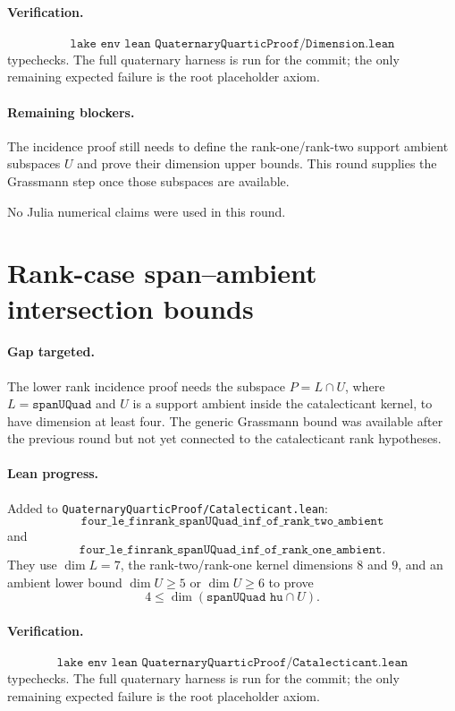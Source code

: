 \documentclass[11pt]{article}
\begin{document}
\paragraph{Verification.}
\[
\texttt{lake env lean QuaternaryQuarticProof/Dimension.lean}
\]
typechecks.  The full quaternary harness is run for the commit; the only
remaining expected failure is the root placeholder axiom.

\paragraph{Remaining blockers.}
The incidence proof still needs to define the rank-one/rank-two support
ambient subspaces \(U\) and prove their dimension upper bounds.  This round
supplies the Grassmann step once those subspaces are available.

No Julia numerical claims were used in this round.

\section*{Rank-case span--ambient intersection bounds}

\paragraph{Gap targeted.}
The lower rank incidence proof needs the subspace
\(P=L\cap U\), where \(L=\texttt{spanUQuad}\) and \(U\) is a support ambient
inside the catalecticant kernel, to have dimension at least four.  The generic
Grassmann bound was available after the previous round but not yet connected to
the catalecticant rank hypotheses.

\paragraph{Lean progress.}
Added to \texttt{QuaternaryQuarticProof/Catalecticant.lean}:
\[
\texttt{four\_le\_finrank\_spanUQuad\_inf\_of\_rank\_two\_ambient}
\]
and
\[
\texttt{four\_le\_finrank\_spanUQuad\_inf\_of\_rank\_one\_ambient}.
\]
They use \(\dim L=7\), the rank-two/rank-one kernel dimensions \(8\) and \(9\),
and an ambient lower bound \(\dim U\ge5\) or \(\dim U\ge6\) to prove
\[
4\le\dim(\texttt{spanUQuad hu} \cap U).
\]

\paragraph{Verification.}
\[
\texttt{lake env lean QuaternaryQuarticProof/Catalecticant.lean}
\]
typechecks.  The full quaternary harness is run for the commit; the only
remaining expected failure is the root placeholder axiom.
\end{document}
